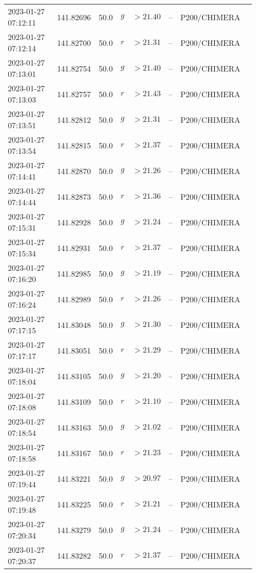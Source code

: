 \documentclass{nature_plusfigure}
\begin{document}
\begin{supplement}
\begin{center}
\begin{longtable}{llllllll}
2023-01-27 07:12:11 & 141.82696 & 50.0 & $g$ & $>21.40$ & -- & P200/CHIMERA &  \\ 
2023-01-27 07:12:14 & 141.82700 & 50.0 & $r$ & $>21.31$ & -- & P200/CHIMERA &  \\ 
2023-01-27 07:13:01 & 141.82754 & 50.0 & $g$ & $>21.40$ & -- & P200/CHIMERA &  \\ 
2023-01-27 07:13:03 & 141.82757 & 50.0 & $r$ & $>21.43$ & -- & P200/CHIMERA &  \\ 
2023-01-27 07:13:51 & 141.82812 & 50.0 & $g$ & $>21.31$ & -- & P200/CHIMERA &  \\ 
2023-01-27 07:13:54 & 141.82815 & 50.0 & $r$ & $>21.37$ & -- & P200/CHIMERA &  \\ 
2023-01-27 07:14:41 & 141.82870 & 50.0 & $g$ & $>21.26$ & -- & P200/CHIMERA &  \\ 
2023-01-27 07:14:44 & 141.82873 & 50.0 & $r$ & $>21.36$ & -- & P200/CHIMERA &  \\ 
2023-01-27 07:15:31 & 141.82928 & 50.0 & $g$ & $>21.24$ & -- & P200/CHIMERA &  \\ 
2023-01-27 07:15:34 & 141.82931 & 50.0 & $r$ & $>21.37$ & -- & P200/CHIMERA &  \\ 
2023-01-27 07:16:20 & 141.82985 & 50.0 & $g$ & $>21.19$ & -- & P200/CHIMERA &  \\ 
2023-01-27 07:16:24 & 141.82989 & 50.0 & $r$ & $>21.26$ & -- & P200/CHIMERA &  \\ 
2023-01-27 07:17:15 & 141.83048 & 50.0 & $g$ & $>21.30$ & -- & P200/CHIMERA &  \\ 
2023-01-27 07:17:17 & 141.83051 & 50.0 & $r$ & $>21.29$ & -- & P200/CHIMERA &  \\ 
2023-01-27 07:18:04 & 141.83105 & 50.0 & $g$ & $>21.20$ & -- & P200/CHIMERA &  \\ 
2023-01-27 07:18:08 & 141.83109 & 50.0 & $r$ & $>21.10$ & -- & P200/CHIMERA &  \\ 
2023-01-27 07:18:54 & 141.83163 & 50.0 & $g$ & $>21.02$ & -- & P200/CHIMERA &  \\ 
2023-01-27 07:18:58 & 141.83167 & 50.0 & $r$ & $>21.23$ & -- & P200/CHIMERA &  \\ 
2023-01-27 07:19:44 & 141.83221 & 50.0 & $g$ & $>20.97$ & -- & P200/CHIMERA &  \\ 
2023-01-27 07:19:48 & 141.83225 & 50.0 & $r$ & $>21.21$ & -- & P200/CHIMERA &  \\ 
2023-01-27 07:20:34 & 141.83279 & 50.0 & $g$ & $>21.24$ & -- & P200/CHIMERA &  \\ 
2023-01-27 07:20:37 & 141.83282 & 50.0 & $r$ & $>21.37$ & -- & P200/CHIMERA &  \\ 

\end{longtable}
\end{center}
\end{supplement}
\end{document}
